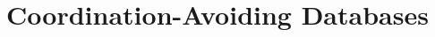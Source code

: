 \documentclass{sig-alternate}
\theoremstyle{definition}
\theoremstyle{remark}
\begin{document}
%

\title{Coordination-Avoiding Databases}

\maketitle






















\scriptsize
 
\end{document}
